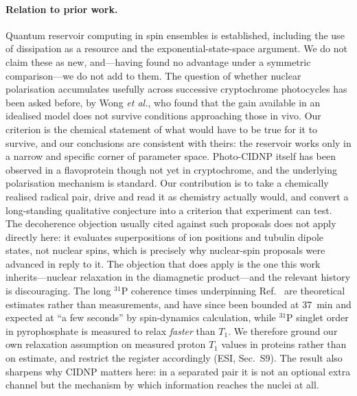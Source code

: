 \documentclass[aps,prx,reprint,superscriptaddress,nofootinbib,floatfix]{revtex4-2}
\begin{document}
\paragraph*{Relation to prior work.}
Quantum reservoir computing in spin ensembles is established, including the use of
dissipation as a resource and the exponential-state-space
argument.\cite{Fujii2017,Nakajima2019,Martinez2021,Mujal2021,Tanaka2019} We do not
claim these as new, and---having found no advantage under a symmetric
comparison---we do not add to them. The question of whether nuclear polarisation
accumulates usefully across successive cryptochrome photocycles has been asked
before, by Wong \textit{et al.}\cite{Wong2021}, who found that the gain available
in an idealised model does not survive conditions approaching those in vivo. Our
criterion is the chemical statement of what would have to be true for it to
survive, and our conclusions are consistent with theirs: the reservoir works only
in a narrow and specific corner of parameter space. Photo-CIDNP itself has been
observed in a flavoprotein\cite{Thamarath2010} though not yet in cryptochrome,
and the underlying polarisation mechanism is
standard\cite{HoreBroadhurst1993}. Our contribution is to take a chemically
realised radical pair, drive and read it as chemistry actually would, and convert a
long-standing qualitative conjecture\cite{Fisher2015,Kerskens2022} into a
criterion that experiment can test. The decoherence objection usually cited
against such proposals\cite{Tegmark2000} does not apply directly here: it
evaluates superpositions of ion positions and tubulin dipole states, not nuclear
spins, which is precisely why nuclear-spin proposals were advanced in reply to
it. The objection that does apply is the one this work inherits---nuclear
relaxation in the diamagnetic product---and the relevant history is
discouraging. The long $^{31}$P coherence times underpinning
Ref.~\cite{Fisher2015} are theoretical estimates rather than measurements, and
have since been bounded at $37$~min and expected at ``a few seconds'' by
spin-dynamics calculation\cite{Player2018}, while $^{31}$P singlet order in
pyrophosphate is measured to relax \emph{faster} than $T_1$\cite{Korenchan2021}.
We therefore ground our own relaxation assumption on measured proton $T_1$ values
in proteins rather than on estimate, and restrict the register accordingly
(ESI, Sec.~S9). The result also sharpens why CIDNP matters here:
in a separated pair it is not an optional extra channel but the mechanism by which
information reaches the nuclei at all.
\end{document}
